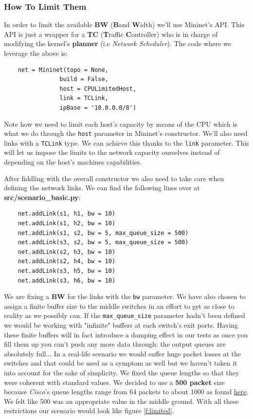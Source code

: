 \documentclass[12pt]{article}
\newcommand{\newpar} {
    \vskip 1cm
}
\begin{document}
		\subsubsection{How To Limit Them}
			In order to limit the available \textbf{BW} (\textbf{B}and \textbf{W}idth) we'll use Mininet's API. This API is just a wrapper for a \textbf{TC} (\textbf{T}raffic \textbf{C}ontroller) who is in charge of modifying the kernel's \textbf{planner} (i.e \textit{Network Scheduler}). The code where we leverage the above is:

			\begin{verbatim}
	net = Mininet(topo = None,
				build = False,
				host = CPULimitedHost,
				link = TCLink,
				ipBase = '10.0.0.0/8')
			\end{verbatim}

			Note how we need to limit each host's capacity by means of the CPU which is what we do through the \texttt{host} parameter in Mininet's constructor. We'll also need links with a \texttt{TCLink} type. We can achieve this thanks to the \texttt{link} parameter. This will let us impose the limits to the network capacity ourselves instead of depending on the host's machines capabilities.
			\newpar
			After fiddling with the overall constructor we also need to take care when defining the network links. We can find the following lines over at \textbf{src/scenario\_basic.py}:

			\begin{verbatim}
	net.addLink(s1, h1, bw = 10)
	net.addLink(s1, h2, bw = 10)
	net.addLink(s1, s2, bw = 5, max_queue_size = 500)
	net.addLink(s3, s2, bw = 5, max_queue_size = 500)
	net.addLink(s2, h3, bw = 10)
	net.addLink(s2, h4, bw = 10)
	net.addLink(s3, h5, bw = 10)
	net.addLink(s3, h6, bw = 10)
			\end{verbatim}

			We are fixing a \textbf{BW} for the links with the \texttt{bw} parameter. We have also chosen to assign a finite buffer size to the middle switches in an effort to get as close to reality as we possibly can. If the \texttt{max\_queue\_size} parameter hadn't been defined we would be working with "infinite" buffers at each switch's exit ports. Having these finite buffers will in fact introduce a damping effect in our tests as once you fill them up you can't push any more data through: the output queues are absolutely full... In a real-life scenario we would suffer huge packet losses at the switches and that could be used as a symptom as well but we haven't taken it into account for the sake of simplicity.\newline
			\newline
			We fixed the queue lengths so that they were coherent with standard values. We decided to use a \textbf{500 packet} size because \textit{Cisco}'s queue lengths range from 64 packets to about 1000 as found \href{https://www.cisco.com/c/en/us/support/docs/routers/7200-series-routers/110850-queue-limit-output-drops-ios.html}{here}. We felt like 500 was an appropriate value in the middle ground. With all these restrictions our scenario would look like figure \ref{f:limited}.
            
\end{document}
